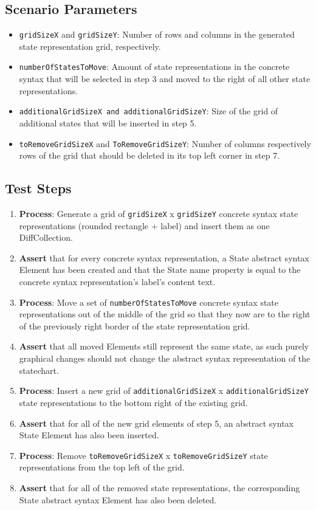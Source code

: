 \subsection{Scenario Parameters}

\begin{itemize}
  \item \texttt{gridSizeX} and \texttt{gridSizeY}: Number of rows and columns in the generated state representation grid, respectively.
  \item \texttt{numberOfStatesToMove}: Amount of state representations in the concrete syntax that will be selected in step 3 and moved to the right of all other state representations.
  \item \texttt{additionalGridSizeX and additionalGridSizeY}: Size of the grid of additional states that will be inserted in step 5.
  \item \texttt{toRemoveGridSizeX} and \texttt{ToRemoveGridSizeY}: Number of columns respectively rows of the grid that should be deleted in its top left corner in step 7.
\end{itemize}
\subsection{Test Steps}
\begin{enumerate}
  \item \textbf{Process}: Generate a grid of \texttt{gridSizeX} x \texttt{gridSizeY} concrete syntax state representations (rounded rectangle + label) and insert them as one DiffCollection.
  \item \textbf{Assert} that for every concrete syntax representation, a State abstract syntax Element has been created and that the State name property is equal to the concrete
  syntax representation’s label’s content text.
  \item \textbf{Process}: Move a set of \texttt{numberOfStatesToMove} concrete syntax state representations out of the middle of the grid so that they now are to the right of the previously right border of the state representation grid.
  \item \textbf{Assert} that all moved Elements still represent the same state, as such purely graphical changes should not change the abstract syntax representation of the statechart.
  \item \textbf{Process}: Insert a new grid of \texttt{additionalGridSizeX} x \texttt{additionalGridSizeY} state representations to the bottom right of the existing grid.
  \item \textbf{Assert} that for all of the new grid elements of step 5, an abstract syntax State Element has also been inserted.
  \item \textbf{Process}:  Remove \texttt{toRemoveGridSizeX} x \texttt{toRemoveGridSizeY} state representations from the top left of the grid.
  \item \textbf{Assert} that for all of the removed state representations, the corresponding State abstract syntax Element has also been deleted.
\end{enumerate}